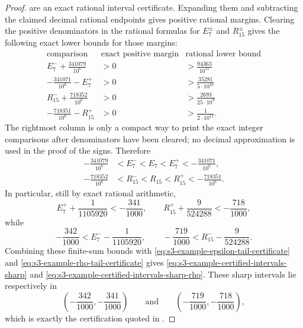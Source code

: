 \documentclass[11pt,a4paper]{amsart}
\theoremstyle{plain}
\theoremstyle{definition}
\theoremstyle{remark}
\begin{document}
\begin{proof}
  are an exact rational interval certificate. Expanding them and
  subtracting the claimed decimal rational endpoints gives positive
  rational margins. Clearing the positive denominators in the rational
  formulas for \(E_7^\pm\) and \(R_{15}^\pm\) gives the following
  exact lower bounds for those margins:
  \[
  \begin{array}{c|c|c}
    \text{comparison} & \text{exact positive margin} & \text{rational lower bound} \\
    \hline
    E_7^-+\frac{341079}{10^6} & >0 & >\frac{94363}{10^{11}}\\
    -\frac{341071}{10^6}-E_7^+ & >0 & >\frac{35281}{5\cdot10^{10}}\\
    R_{15}^-+\frac{718352}{10^6} & >0 & >\frac{2693}{25\cdot10^{9}}\\
    -\frac{718351}{10^6}-R_{15}^+ & >0 & >\frac{1}{2\cdot10^{12}}.
  \end{array}
  \]
  The rightmost column is only a compact way to print the exact
  integer comparisons after denominators have been cleared; no decimal
  approximation is used in the proof of the signs.
  Therefore
  \begin{equation}\label{eq:s3-example-finite-sum-windows}
    \begin{aligned}
      -\frac{341079}{10^6}
      &<E_7^-<E_7<E_7^+<-\frac{341071}{10^6}, \\
      -\frac{718352}{10^6}
      &<R_{15}^-<R_{15}<R_{15}^+<-\frac{718351}{10^6}.
    \end{aligned}
  \end{equation}
  In particular, still by exact rational arithmetic,
  \[
    E_7^+ +\frac1{1105920}<-\frac{341}{1000},
    \qquad
    R_{15}^+ +\frac9{524288}<-\frac{718}{1000},
  \]
  while
  \[
    -\frac{342}{1000}<E_7^- -\frac1{1105920},
    \qquad
    -\frac{719}{1000}<R_{15}^- -\frac9{524288}.
  \]
  Combining these finite-sum bounds with
  \eqref{eq:s3-example-epsilon-tail-certificate} and
  \eqref{eq:s3-example-rho-tail-certificate} gives
  \eqref{eq:s3-example-certified-intervals-sharp} and
  \eqref{eq:s3-example-certified-intervals-sharp-rho}. These sharp
  intervals lie respectively in
  \[
    \left(-\frac{342}{1000},-\frac{341}{1000}\right)
    \qquad\text{and}\qquad
    \left(-\frac{719}{1000},-\frac{718}{1000}\right),
  \]
  which is exactly the certification quoted in
  .
\end{proof}
\end{document}
